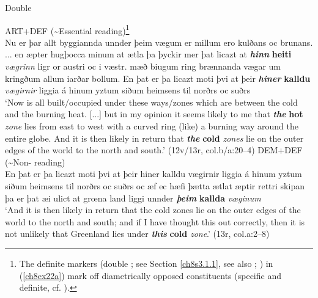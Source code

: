 \documentclass[output=paper,colorlinks,citecolor=brown]{langscibook}
\begin{document}
\begin{exe}
\ex\label{ch8ex22}Double 
\begin{xlist}
\ex\label{ch8ex22a}ART+DEF (\textasciitilde Essential reading)\footnote{The definite
  markers (double ; see Section \ref{ch8s3.1.1}, see also \citealp{Schwarzschild1999}; \citealp{Wagner2006}) in (\ref{ch8ex22a}) mark off
  diametrically opposed constituents (specific and definite, cf. \citealp[784]{AbohCorverDyakonovaKoppen2010}).}\\
\noindent Nu er þar allt byggiannda unnder þeim vægum er millum ero kulðans oc
brunans. ... en æpter hugþocca minum at ætla þa þyckir mer þat licazt at
\textbf{\textit{hinn}} \textbf{heiti} \textit{vægrinn} ligr or austri oc i væstr. mæð biugum ring
brænnanda vægar um kringðum allum iarðar bollum. En þat er þa licazt
moti þvi at þeir \textit{\textbf{hiner}} \textbf{kalldu} \textit{vægirnir} liggia á hinum yztum
siðum heimsens til norðrs oc suðrs \\
\noindent `Now is all built/occupied under these ways/zones which are between the
cold and the burning heat. {[}...{]} but in my opinion it seems likely
to me that \textit{\textbf{the}} \textbf{hot} \textit{zone} lies from east to west with a curved
ring (like) a burning way around the entire globe. And it is then likely
in return that \textbf{\textit{the}} \textbf{cold}\textit{ zones} lie on the outer edges of the
world to the north and south.' (12v/13r, col.b/a:20--4)
\ex\label{ch8ex22b}DEM+DEF (\textasciitilde Non- reading)\\
\noindent En þat er þa licazt moti þvi at þeir hiner kalldu vægirnir
liggia á hinum yztum siðum heimsens til norðrs oc suðrs oc æf ec hæfi
þætta ætlat æptir rettri skipan þa er þat æi ulict at grœna land liggi
unnder \textit{\textbf{þeim}} \textbf{kallda} \textit{væginum} \\
\noindent `And it is then likely in return that the cold zones lie on
the outer edges of the world to the north and south; and if I have
thought this out correctly, then it is not unlikely that Greenland lies
under \textit{\textbf{this}} \textbf{cold} \textit{zone}.' (13r, col.a:2--8)
\end{xlist}
\end{exe}
\end{document}
